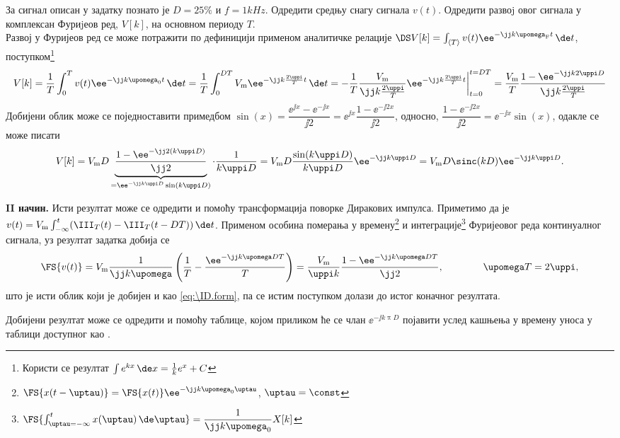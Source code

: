 \PID \label{z:rect_povorka}
За сигнал описан у задатку  познато је 
$D = 25\%$ и $f = 1\unit{kHz}$. Одредити средњу снагу сигнала $v(t)$.
Одредити развоj овог сигнала у комплексан Фуриjеов ред, $V[k]$, на основном периоду $T$.
\\[2mm]

\RESENJE  Развој у Фуријеов ред се може потражити по дефиницији применом 
аналитичке релације 
$\DS V[k] = \int_{\langle T \rangle} v(t) \ee^{-\jj k \upomega_{\rm F} t} \, \de t$, 
поступком\footnote{Користи се резултат $\int e^{kx} \, \de x = \frac{1}{k} e^x + C$}
\begin{align}
    V[k] = \dfrac{1}{T} \int_{0}^T v(t) \ee^{-\jj k \upomega_{\rm 0} t} \, \de t 
         = \dfrac{1}{T} \int_{0}^{DT}  V_{\rm m} \ee^{-\jj k \frac{2\uppi}{T} t} \, \de t
         = - \dfrac{1}{T} \dfrac{V_{\rm m}}{\jj k \frac{2\uppi}{T}} 
         \ee^{-\jj k \frac{2\uppi}{T} t}\bigg|_{t = 0}^{t = DT}
         = \dfrac{V_{\rm m}}{T} \dfrac{
            1
            -
            \ee^{-\jj k 2\uppi D}
         }{\jj k \frac{2\uppi}{T}} 
\end{align}
Добијени облик може се поједноставити примедбом 
$\sin(x) = \dfrac{\ee^{\jj x} - \ee^{-\jj x}}{\jj 2} = \ee^{\jj x} \dfrac{1 - \ee^{-\jj 2x}}{\jj 2}$,
односно, 
$\dfrac{1 - \ee^{-\jj 2x}}{\jj 2} = \ee^{-\jj x} \sin(x) $,
одакле се може писати
\begin{align}
    V[k] = V_{\rm m}D 
     \underbrace{
     \dfrac{
        1
        -
        \ee^{-\jj 2 (k \uppi D) }
     }{\jj 2 }}_{ = \ee^{-\jj k \uppi D} \sin(k\uppi D) }
     \cdot 
     \dfrac{1}{k \uppi D} 
     = V_{\rm m} D \dfrac{\sin(k\uppi D)}{k\uppi D} \ee^{-\jj k \uppi D} 
     = V_{\rm m} D \sinc(k D) \ee^{-\jj k \uppi D}. \label{eq:\ID.form}
\end{align}

\textbf{II начин.} Исти резултат може  се одредити и помоћу трансформација поворке Диракових импулса. 
Приметимо да је $v(t) = V_{\rm m} \int_{-\infty}^t (\III_T(t) - \III_T(t - DT))\, \de t$. Применом особина 
померања у времену\footnote{
   $\FS{x(t-\uptau)} = \FS{x(t)} \ee^{-\jj k \upomega_{\rm 0} \uptau}$, $\uptau = \const$
}
и интеграције\footnote{
   $\FS{ \int_{\uptau = -\infty}^t x(\uptau) \, \de \uptau } = \dfrac{1}{\jj k \upomega_0} X[k]$ 
} Фуријеовог реда континуалног сигнала, уз резултат задатка  добија се 
\begin{equation}
   \FS{v(t)} = V_{\rm m} \dfrac{1}{\jj k \upomega }  \left( \dfrac{1}{T} - \dfrac{\ee^{-\jj k \upomega D T}}{T} \right)
             = \dfrac{V_{\rm m}}{\uppi k} \dfrac{1 - \ee^{-\jj k \upomega D T}}{\jj 2}, \qquad \qquad \upomega T = 2\uppi,
\end{equation}
што је исти облик који је добијен и као \eqref{eq:\ID.form}, па се истим поступком долази до истог коначног резултата.

Добијени резултат може се одредити и помоћу таблице, којом приликом ће се члан 
$\ee^{-\jj k \uppi D}$ појавити услед кашњења у времену уноса у таблици доступног као . 
